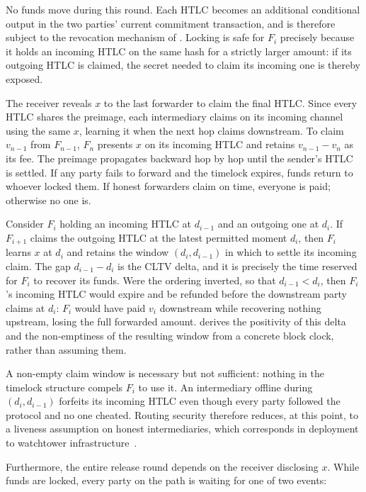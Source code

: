 No funds move during this round. Each HTLC becomes an additional conditional
output in the two parties' current commitment transaction, and is therefore
subject to the revocation mechanism of . Locking is
safe for $F_i$ precisely because it holds an incoming HTLC on the same hash for
a strictly larger amount: if its outgoing HTLC is claimed, the secret needed to
claim its incoming one is thereby exposed.

The receiver reveals $x$ to the last forwarder to claim the final HTLC. Since
every HTLC shares the preimage, each intermediary claims on its incoming
channel using the same $x$, learning it when the next hop claims downstream. To
claim $v_{n-1}$ from $F_{n-1}$, $F_n$ presents $x$ on its incoming HTLC and
retains $v_{n-1} - v_n$ as its fee. The preimage propagates backward hop by hop
until the sender's HTLC is settled. If any party fails to forward and the
timelock expires, funds return to whoever locked them. If honest forwarders
claim on time, everyone is paid; otherwise no one is.

Consider $F_i$ holding an incoming HTLC at $d_{i-1}$ and an outgoing one at
$d_i$. If $F_{i+1}$ claims the outgoing HTLC at the latest permitted moment
$d_i$, then $F_i$ learns $x$ at $d_i$ and retains the window $(d_i, d_{i-1})$
in which to settle its incoming claim. The gap $d_{i-1} - d_i$ is the CLTV
delta, and it is precisely the time reserved for $F_i$ to recover its funds.
Were the ordering inverted, so that $d_{i-1} < d_i$, then $F_i$'s incoming HTLC
would expire and be refunded before the downstream party claims at $d_i$: $F_i$
would have paid $v_i$ downstream while recovering nothing upstream, losing the
full forwarded amount.  derives the positivity of this
delta and the non-emptiness of the resulting window from a concrete block
clock, rather than assuming them.

A non-empty claim window is necessary but not sufficient: nothing in the
timelock structure compels $F_i$ to use it. An intermediary offline during
$(d_i, d_{i-1})$ forfeits its incoming HTLC even though every party followed
the protocol and no one cheated. Routing security therefore reduces, at this
point, to a liveness assumption on honest intermediaries, which corresponds in
deployment to watchtower infrastructure~\cite{mccorry2019pisa}.

Furthermore, the entire release round depends on the receiver disclosing $x$.
While funds are locked, every party on the path is waiting for one of two
events:

